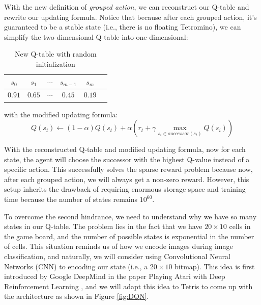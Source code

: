 \documentclass[letterpaper]{article} %
\begin{document}
With the new definition of \textit{grouped action}, we can reconstruct our Q-table and rewrite our updating formula. Notice that because after each grouped action, it's guaranteed to be a stable state (i.e., there is no floating Tetromino), we can simplify the two-dimensional Q-table into one-dimensional:
\begin{table}[h!]
  \centering
  \normalsize{
    \begin{tabular}{ |c|c|c|c|c|c| } 
      \hline
      $s_{0}$ & $s_{1}$ & $\cdots$ & $s_{m-1}$ & $s_{m}$  \\ 
      \hline
      $0.91$ & $0.65$ &$\cdots $ &$0.45$ &$0.19$  \\ 
       \hline
      \end{tabular}}
  \caption{New Q-table with random initialization}
  \label{tab:qtbale}
\end{table}

with the modified updating formula:
\[
    Q(s_{t}) \leftarrow (1-\alpha) Q(s_{t}) + \alpha   \left ( r_{t} + \gamma  \max_{s_{i} \in successor(s_{t})}Q(s_{i})\right ) 
\]

With the reconstructed Q-table and modified updating formula, now for each state, the agent will choose the successor with the highest Q-value instead of a specific action. This successfully solves the sparse reward problem because now, after each grouped action, we will always get a non-zero reward. However, this setup inherits the drawback of requiring enormous storage space and training time because the number of states remains $10^{60}$. 

To overcome the second hindrance, we need to understand why we have so many states in our Q-table. The problem lies in the fact that we have $20\times 10$ cells in the game board, and the number of possible states is exponential in the number of cells. This situation reminds us of how we encode images during image classification, and naturally, we will consider using Convolutional Neural Networks (CNN) to encoding our state (i.e., a $20\times 10$ bitmap).  This idea is first introduced by Google DeepMind in the paper Playing Atari with Deep Reinforcement Learning \cite{Mnih_2013}, and we will adapt this idea to Tetris to come up with the architecture as shown in Figure \ref{fig:DQN}.
\end{document}
